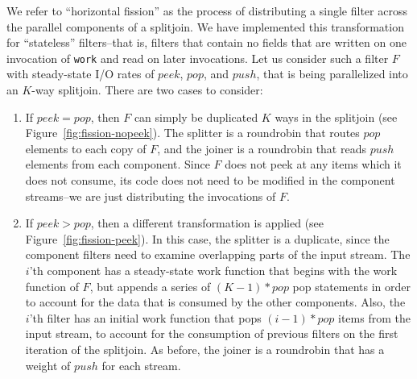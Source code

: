 We refer to ``horizontal fission'' as the process of distributing a
single filter across the parallel components of a splitjoin.  We have
implemented this transformation for ``stateless'' filters--that is,
filters that contain no fields that are written on one invocation of
{\tt work} and read on later invocations.  Let us consider such a
filter $F$ with steady-state I/O rates of $peek$, $pop$, and $push$,
that is being parallelized into an $K$-way splitjoin.  There are two
cases to consider:
\begin{enumerate}
\item If {\bf $peek = pop$}, then $F$ can simply be duplicated $K$
ways in the splitjoin (see Figure~\ref{fig:fission-nopeek}).  The
splitter is a roundrobin that routes $pop$ elements to each copy of
$F$, and the joiner is a roundrobin that reads $push$ elements from
each component.  Since $F$ does not peek at any items which it does
not consume, its code does not need to be modified in the component
streams--we are just distributing the invocations of $F$.

\item If {\bf $peek > pop$}, then a different transformation is
applied (see Figure~\ref{fig:fission-peek}).  In this case, the
splitter is a duplicate, since the component filters need to examine
overlapping parts of the input stream.  The $i$'th component has a
steady-state work function that begins with the work function of $F$,
but appends a series of $(K-1)*pop$ pop statements in order to account
for the data that is consumed by the other components.  Also, the
$i$'th filter has an initial work function that pops $(i-1)*pop$ items
from the input stream, to account for the consumption of previous
filters on the first iteration of the splitjoin.  As before, the
joiner is a roundrobin that has a weight of $push$ for each stream.
\end{enumerate}


